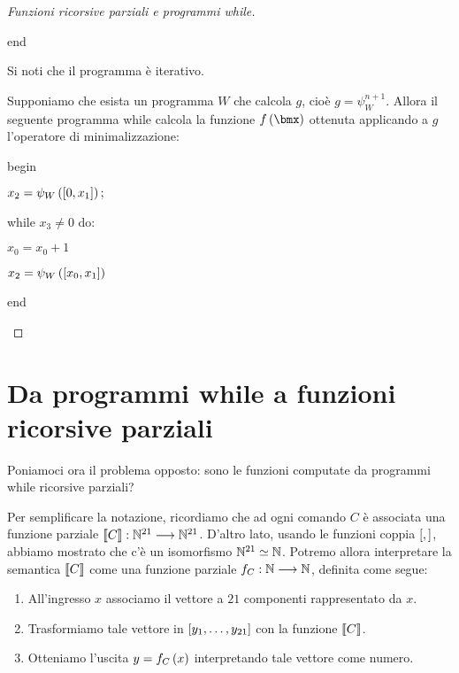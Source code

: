 \documentclass{lectures}
\begin{document}
\begin{multicols}{2}
\begin{proof}[Funzioni ricorsive parziali e programmi while]
\begin{description}
\begin{description}
\begin{description}
                \end{description}
                \item end
            \end{description}
            Si noti che il programma è iterativo.
            \item[Minimalizzazione:] Supponiamo che esista un programma \(W\) che calcola \(g\), cioè \(g = \psi^{n+1}_W\). Allora il seguente programma while calcola la funzione \(f\rnd{\bmx}\) ottenuta applicando a \(g\) l'operatore di minimalizzazione:
            \begin{description}
                \item begin
                \begin{description}
                    \item \(x_2 = \psi_W\left(\left[0, x_1\right]\right);\)
                    \item while \(x_3 \neq 0\) do:
                    \begin{description}
                        \item \(x_0 = x_0 + 1\)
                        \item \(x_2 = \psi_W\left(\left[x_0, x_1\right]\right)\)
                    \end{description}
                \end{description}
                \item end
            \end{description}
        \end{description}
    \end{proof}
\end{multicols}
\clearpage
\section{Da programmi while a funzioni ricorsive parziali}
Poniamoci ora il problema opposto: sono le funzioni computate da programmi while ricorsive parziali?

Per semplificare la notazione, ricordiamo che ad ogni comando \(C\) è associata una funzione parziale \(\llbracket C\rrbracket:\mathbb{N}^{21}\longrightarrow \mathbb{N}^{21}\). D'altro lato, usando le funzioni coppia \(\left[,\right]\), abbiamo mostrato che c'è un isomorfismo \(\mathbb{N}^{21} \simeq \mathbb{N}\). Potremo allora interpretare la semantica \(\llbracket C\rrbracket\) come una funzione parziale \(f_C:\mathbb{N}\longrightarrow \mathbb{N}\), definita come segue:
\begin{enumerate}
    \item All'ingresso \(x\) associamo il vettore a \(21\) componenti rappresentato da \(x\).
    \item Trasformiamo tale vettore in \(\left[y_1, \ldots, y_{21}\right]\) con la funzione \(\llbracket C\rrbracket\).
    \item Otteniamo l'uscita \(y = f_C\left(x\right)\) interpretando tale vettore come numero.
\end{enumerate}
\end{document}
